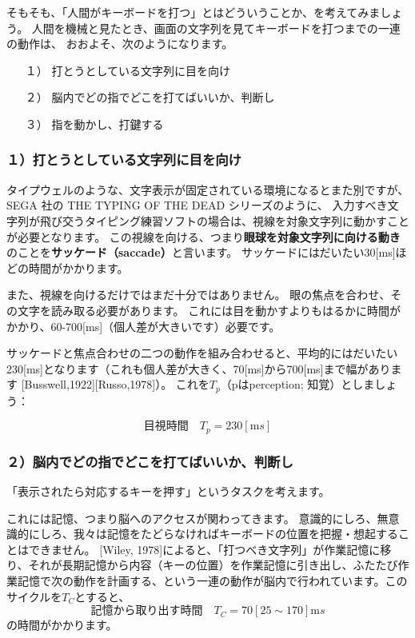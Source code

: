 そもそも、「人間がキーボードを打つ」とはどういうことか、を考えてみましょう。
人間を機械と見たとき、画面の文字列を見てキーボードを打つまでの一連の動作は、
おおよそ、次のようになります。
\begin{itemize}
\item[１）] 打とうとしている文字列に目を向け
\item[２）] 脳内でどの指でどこを打てばいいか、判断し
\item[３）] 指を動かし、打鍵する
\end{itemize}

\subsubsection*{１）打とうとしている文字列に目を向け}

タイプウェルのような、文字表示が固定されている環境になるとまた別ですが、
SEGA 社の THE TYPING OF THE DEAD シリーズのように、
入力すべき文字列が飛び交うタイピング練習ソフトの場合は、視線を対象文字列に動かすことが必要となります。
この視線を向ける、つまり{\bf 眼球を対象文字列に向ける動き}のことを{\bf サッケード（saccade）}と言います。
サッケードにはだいたい30[ms]ほどの時間がかかります。

また、視線を向けるだけではまだ十分ではありません。
眼の焦点を合わせ、その文字を読み取る必要があります。
これには目を動かすよりもはるかに時間がかかり、60-700[ms]（個人差が大きいです）必要です。

サッケードと焦点合わせの二つの動作を組み合わせると、平均的にはだいたい230[ms]となります（これも個人差が大きく、70[ms]から700[ms]まで幅があります [Busswell,1922][Russo,1978]）。
これを$T_p$（pはperception; 知覚）としましょう：

\[
目視時間 \quad T_p = 230 [{\mathrm ms}]
\]

\subsubsection*{２）脳内でどの指でどこを打てばいいか、判断し}

「表示されたら対応するキーを押す」というタスクを考えます。

これには記憶、つまり脳へのアクセスが関わってきます。
意識的にしろ、無意識的にしろ、我々は記憶をたどらなければキーボードの位置を把握・想起することはできません。
[Wiley, 1978]によると、「打つべき文字列」が作業記憶に移り、それが長期記憶から内容（キーの位置）を作業記憶に引き出し、ふたたび作業記憶で次の動作を計画する、という一連の動作が脳内で行われています。このサイクルを$T_C$とすると、
\[
 記憶から取り出す時間 \quad T_C = 70 [25 \sim 170] {\mathrm ms}
\]
の時間がかかります。

